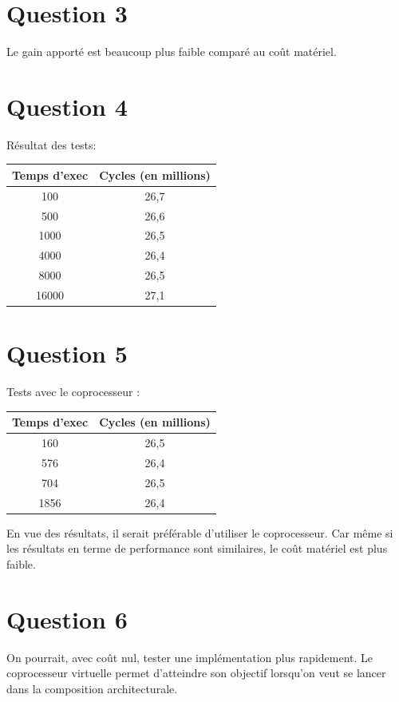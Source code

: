 \documentclass[12pt]{article}
\begin{document}
\section*{Question 3}
Le gain apporté est beaucoup plus faible comparé au coût matériel.
\section*{Question 4}
Résultat des tests:
\begin{center}
\begin{tabular}{|c|c|}
\hline
Temps d'exec & Cycles (en millions)\\ \hline
100 & 26,7\\ \hline
500 & 26,6\\ \hline
1000 & 26,5\\ \hline
4000 & 26,4\\ \hline
8000 & 26,5\\ \hline
16000 & 27,1\\ \hline
\end{tabular}\newline
\end{center}
\section*{Question 5}
Tests avec le coprocesseur :
\begin{center}
\begin{tabular}{|c|c|}
\hline
Temps d'exec & Cycles (en millions)\\ \hline
160 & 26,5\\ \hline
576 & 26,4\\ \hline
704 & 26,5\\ \hline
1856 & 26,4\\ \hline
\end{tabular}\newline
\end{center}
En vue des résultats, il serait préférable d'utiliser le coprocesseur. Car même si les résultats en terme de performance sont similaires, le coût matériel est plus faible.

\section*{Question 6}
On pourrait, avec coût nul, tester une implémentation plus rapidement. Le coprocesseur virtuelle permet d'atteindre son objectif lorsqu'on veut se lancer dans la composition architecturale.
\end{document}
